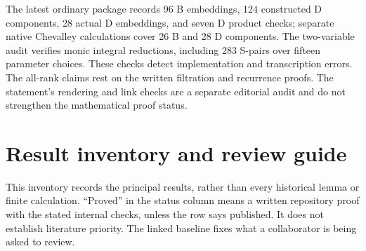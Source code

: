The latest ordinary package records 96 B embeddings, 124 constructed D components, 28 actual D embeddings, and seven D product checks; separate native Chevalley calculations cover 26 B and 28 D components. The two-variable audit verifies monic integral reductions, including 283 S-pairs over fifteen parameter choices. These checks detect implementation and transcription errors. The all-rank claims rest on the written filtration and recurrence proofs. The statement's rendering and link checks are a separate editorial audit and do not strengthen the mathematical proof status.


\appendix
\section{Result inventory and review guide}
This inventory records the principal results, rather than every historical lemma or finite calculation. ``Proved'' in the status column means a written repository proof with the stated internal checks, unless the row says published. It does not establish literature priority. The linked baseline fixes what a collaborator is being asked to review.

